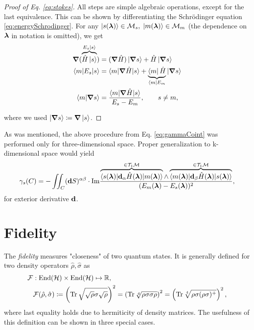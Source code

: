 \begin{proof}[Proof of Eq. \ref{eq:stokes}]
 All steps are simple algebraic operations, except for the last equivalence. This can be shown by differentiating the Schr\"odinger equation \ref{eq:energySchrodinger}. For any $\ket{s({\bm\lambda})}\in \mathcal{M}_s,\;\ket{m({\bm\lambda})}\in \mathcal{M}_m$ (the dependence on ${\bm\lambda}$ in notation is omitted), we get
\begin{equation}
    \begin{split}
        \bm \nabla (\overbrace{\hat{H}\ket{s}}^{E_s\ket{s}})&= (\bm\nabla \hat{H})\ket{\bm \nabla s} +\hat{H} \ket{\bm \nabla s}\\
        \braket{m|E_s|s}&= \braket{m|\bm \nabla \hat{H}| s}+ \underbrace{\bra{m} \hat{H}}_{\bra{m} E_m} |\bm\nabla s\rangle \\
        \braket{m|\bm \nabla s}&=
        \frac{\braket{m|\bm \nabla \hat{H} |s}}
        { E_s-E_m}, \qquad s\neq m,
    \end{split}
    \label{eq:mgradn_proof}
\end{equation}

where we used $\ket{\bm \nabla s}\coloneqq\bm \nabla \ket{ s}$.    
\end{proof} 

As was mentioned, the above procedure from Eq. \ref{eq:gammaCoint} was performed only for three-dimensional space. Proper generalization to k-dimensional space would yield
\begin{equation}
    \gamma_s(C) = -\iint_C (\bm{\mathrm{d}} S)^{\alpha\beta} \cdot\textrm{Im} \frac{
        \overbrace{\braket{s({\bm\lambda})|\bm{\mathrm{d}}_\alpha \hat{H}({\bm\lambda}) |m({\bm\lambda})}}^{\in\mathcal{T}_1\mathcal{M}}\wedge \overbrace{\braket{m({\bm\lambda})|\bm{\mathrm{d}}_\beta\hat{H}({\bm\lambda})|s({\bm\lambda})}}^{\in\mathcal{T}_1\mathcal{M}}    
    }{
        (E_m({\bm\lambda})-E_s({\bm\lambda}))^2
    },
    \label{eq:mgrads}
\end{equation}
for exterior derivative $\bm{\mathrm{d}}$.
                
                
                



\section{Fidelity}
The \emph{fidelity} measures "closeness" of two quantum states. It is generally defined for two density operators $\hat\rho, \hat\sigma$ as
\begin{equation}
    \begin{split}
        \mathcal F&: \operatorname{End}(\mathcal{H})\times \operatorname{End}(\mathcal{H})\mapsto \mathbb{R}, \\
        &\mathcal F(\hat\rho,\hat\sigma)\coloneqq \left(\operatorname{\textrm{Tr}} \sqrt{\sqrt{\rho}\sigma\sqrt{\rho}}\right)^2 = \left(\operatorname{\textrm{Tr}}\sqrt[4]{\rho \sigma \sigma \rho}\right)^2= \left(\operatorname{\textrm{Tr}}\sqrt[4]{\rho \sigma (\rho\sigma)^+ }\right)^2,
    \end{split}
    \label{eq:fidelitydef}
\end{equation}
where last equality holds due to hermiticity of density matrices.
The usefulness of this definition can be shown in three special cases.


